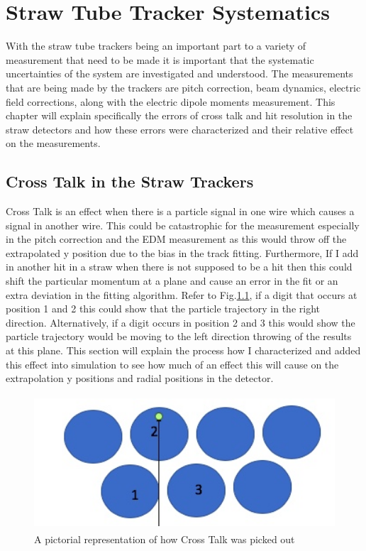 \documentclass[./Thesis]{subfiles}
\begin{document}
\chapter{Straw Tube Tracker Systematics}

With the straw tube trackers being an important part to a variety of measurement that need to be made it is important that the systematic uncertainties of the system are investigated and understood.  The measurements that are being made by the trackers are pitch correction, beam dynamics, electric field corrections, along with the electric dipole moments measurement.  This chapter will explain specifically the errors of cross talk and hit resolution in the straw detectors and how these errors were characterized and their relative effect on the measurements.

\section{Cross Talk in the Straw Trackers}

Cross Talk is an effect when there is a particle signal in one wire which causes a signal in another wire.  This could be catastrophic for the measurement especially in the pitch correction and the EDM measurement as this would throw off the extrapolated y position due to the bias in the track fitting.  Furthermore, If I add in another hit in a straw when there is not supposed to be a hit then this could shift the particular momentum at a plane and cause an error in the fit or an extra deviation in the fitting algorithm.  Refer to Fig.\ref{fig:PicXtalk}, if a digit that occurs at position 1 and 2 this could show that the particle trajectory in the right direction. Alternatively, if a digit occurs in position 2 and 3 this would show the particle trajectory would be moving to the left direction throwing of the results at this plane.  This section will explain the process how I characterized and added this effect into simulation to see how much of an effect this will cause on the extrapolation y positions and radial positions in the detector.

\begin{figure}
	\centerline{\includegraphics[height=50mm]{CrossTalkEval.jpeg}}
	\caption[ Pictorial Representation of Picking out Cross Talk]{ A pictorial representation of how Cross Talk was picked out}
	\label{fig:PicXtalk}
\end{figure}
\end{document}
